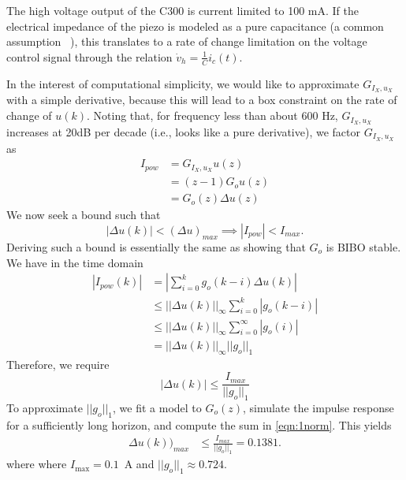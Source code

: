 \documentclass[journal,twocolumn,twoside]{IEEEtran}
\begin{document}
The high voltage output of the C300 is current limited to 100 mA. If the electrical impedance of the piezo is modeled as a pure capacitance (a common assumption  ~\cite{fleming_megahertz_2009, Bazghaleh_digital_2013}), this translates to a rate of change limitation on the voltage control signal through the relation $\dot v_{h} = \frac{1}{C} i_c(t)$. 



In the interest of computational simplicity, we would like to approximate $G_{I_X,u_X}$ with a simple derivative, because this will lead to a box constraint on the rate of change of $u(k)$. Noting that, for frequency less than about 600 Hz, $G_{I_X,u_X}$ increases at 20dB per decade (i.e., looks like a pure derivative), we factor $G_{I_X,u_X}$ as
\begin{align}
  I_{pow} &= G_{I_X,u_X} u(z)\\
          & = (z-1) G_o u(z)\\
          & = G_o(z) \Delta u(z)
\end{align}
We now seek a bound such that
\begin{equation}
  |\Delta u(k)| < (\Delta u)_{max} \implies |I_{pow}| < I_{max}.
\end{equation}
Deriving such a bound is essentially the same as showing that $G_o$ is BIBO stable. We have in the time domain
\begin{align}
  |I_{pow}(k)| &= |\sum_{i=0}^{k} g_o(k-i)\Delta u(k)|\\
               &\leq ||\Delta u(k)||_{\infty} \sum_{i=0}^{k} |g_o(k-i)|  \\
               & \leq ||\Delta u(k)||_{\infty} \sum_{i=0}^{\infty} |g_o(i)|  \label{eqn:1norm}\\
               & = ||\Delta u(k)||_{\infty} ||g_o||_1  
\end{align}
Therefore, we require
\begin{equation}
|\Delta u(k)| \leq \frac{I_{max}}{||g_o||_1}
\end{equation}
To approximate $||g_o||_1$, we fit a model to $G_o(z)$, simulate the impulse response for a sufficiently long horizon, and compute the sum in \eqref{eqn:1norm}. This yields
\begin{align}
\Delta u(k))_{max} & \leq \frac{I_{max}}{||g_o||_1} = 0.1381. \label{eqn:du_limit}
\end{align}
where where $I_{\text{max}} = 0.1$~A and $||g_o||_1 \approx 0.724$.
\end{document}
